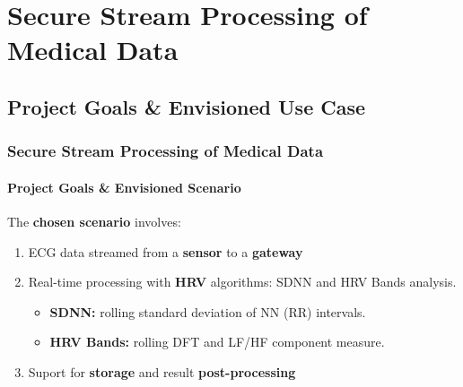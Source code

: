 \documentclass[10pt,    %
    english,            %
    xcolor=table,       %
    envcountsect,        %
    aspectratio=169     %
]{beamer}
\begin{document}
\section{Secure Stream Processing of Medical Data}
\label{sec:medspark}
\sectionframe

\subsection{Project Goals \& Envisioned Use Case}

\begin{frame}
    \frametitle{Secure Stream Processing of Medical Data}
    \framesubtitle{Project Goals \& Envisioned Scenario}


    The \textbf{chosen scenario} involves:
    \begin{enumerate}
        \item ECG data streamed from a \textbf{sensor} to a \textbf{gateway}
        \item Real-time processing with \textbf{HRV} algorithms: SDNN and HRV Bands analysis.
        \begin{itemize}
            \item \textbf{SDNN:} rolling standard deviation of NN (RR) intervals.
            \item \textbf{HRV Bands:} rolling DFT and LF/HF component measure.
        \end{itemize}
        \item Suport for \textbf{storage} and result \textbf{post-processing}
    \end{enumerate}


\end{frame}
\end{document}
